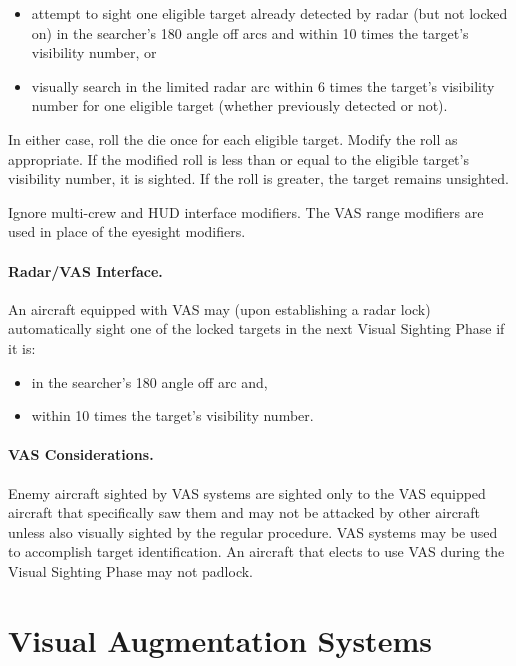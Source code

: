 \begin{advancedrules}
{\begin{itemize}

    \item attempt to sight one eligible target already detected by radar (but not locked on) in the searcher's 180{\deg} angle off arcs and within 10 times the target's visibility number, or

    \item visually search in the limited radar arc within 6 times the target's visibility number for one eligible target (whether previously detected or not).

\end{itemize}

In either case, roll the die once for each eligible target. Modify the roll as appropriate. If the modified roll is less than or equal to the eligible target's visibility number, it is sighted. If the roll is greater, the target remains unsighted.

Ignore multi-crew and HUD interface modifiers. The VAS range modifiers are used in place of the eyesight modifiers.

\paragraph{Radar/VAS Interface.} An aircraft equipped with VAS may (upon establishing a radar lock) automatically sight one of the locked targets in the next Visual Sighting Phase if it is:

\begin{itemize}
    \item in the searcher's 180{\deg} angle off arc and,
    \item within 10 times the target's visibility number.
\end{itemize}

\paragraph{VAS Considerations.} Enemy aircraft sighted by VAS systems are sighted only to the VAS equipped aircraft that specifically saw them and may not be attacked by other aircraft unless also visually sighted by the regular procedure. VAS systems may be used to accomplish target identification. An aircraft that elects to use VAS during the Visual Sighting Phase may not padlock.

}{

\section{Visual Augmentation Systems}
\label{rule:vas}

}
\end{advancedrules}
